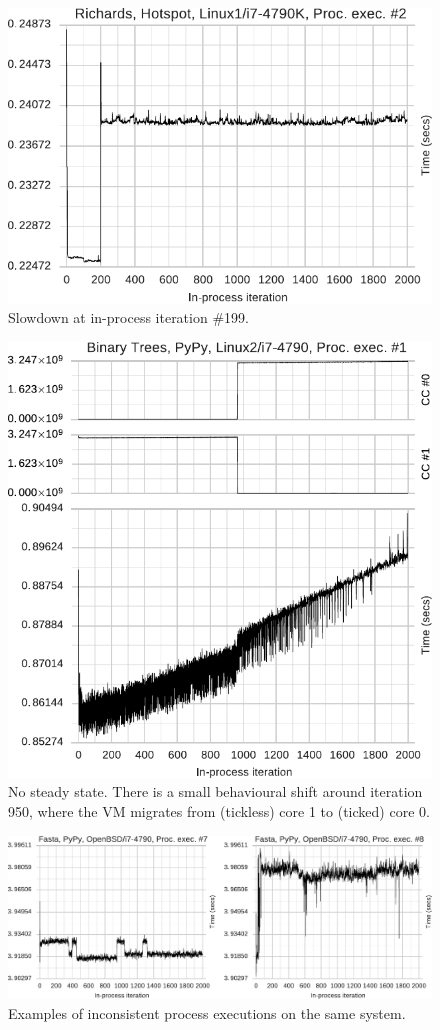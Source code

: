 \documentclass[preprint,numbers,10pt]{sigplanconf}
\begin{document}
\begin{figure}[t]
\centering
\includegraphics[width=.45\textwidth]{examples/new_slowdown.pdf}
\caption{Slowdown at in-process iteration \#199.}
\label{fig:examples:slowdown1}
\end{figure}

\begin{figure}[t]
\centering
\includegraphics[width=.45\textwidth]{examples/new_no_steady.pdf}
\caption{No steady state. There is a small behavioural shift around iteration
950, where the VM migrates from (tickless) core 1 to (ticked) core 0.}
\label{fig:examples:nosteadystate}
\end{figure}

\begin{figure}[t!]
\centering
\includegraphics[width=\textwidth]{examples/new_inconsistent.pdf}
\caption{Examples of inconsistent process executions on the same system.}
\label{fig:examples:inconsistent}
\end{figure}
\end{document}
